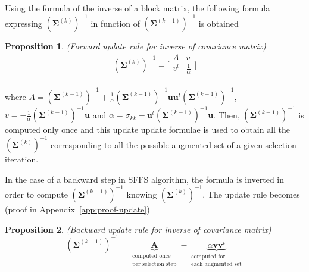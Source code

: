 \documentclass[journal,peerreview,onecolumn]{IEEEtran}
\newtheorem{prop}{Proposition}
\begin{document}
        Using the formula of the inverse of a block matrix, the following formula expressing $(\boldsymbol{\Sigma}^{(k)})^{-1}$ in function of $(\boldsymbol{\Sigma}^{(k-1)})^{-1}$ is obtained
        \begin{prop}
        \label{eq:update-inv}
            (Forward update rule for inverse of covariance matrix)
            \begin{equation*}
                (\boldsymbol{\Sigma}^{(k)})^{-1} =
                \bigg[\begin{array}{cc}
                A & v \\
                v^t  & \frac{1}{\alpha} \\
                \end{array}\bigg]
            \end{equation*}
        \end{prop}
        where $A = (\boldsymbol{\Sigma}^{(k-1)})^{-1} + \frac{1}{\alpha} (\boldsymbol{\Sigma}^{(k-1)})^{-1} \mathbf{u} \mathbf{u}^t (\boldsymbol{\Sigma}^{(k-1)})^{-1}$, $v = - \frac{1}{\alpha} (\boldsymbol{\Sigma}^{(k-1)})^{-1} \mathbf{u}$ and $ \alpha = \sigma_{kk} - \mathbf{u}^t (\boldsymbol{\Sigma}^{(k-1)})^{-1} \mathbf{u}$. Then, $(\boldsymbol{\Sigma}^{(k-1)})^{-1}$ is computed only once and this update update formulae is used to obtain all the $(\boldsymbol{\Sigma}^{(k)})^{-1}$ corresponding to all the possible augmented set of a given selection iteration.

        In the case of a backward step in SFFS algorithm, the formula is inverted in order to compute $(\boldsymbol{\Sigma}^{(k-1)})^{-1}$ knowing $(\boldsymbol{\Sigma}^{(k)})^{-1}$. The update rule becomes (proof in Appendix~\ref{app:proof-update})
        \begin{prop}
        \label{eq:update-inv-back}
            (Backward update rule for inverse of covariance matrix)
            \begin{equation*}
                (\boldsymbol{\Sigma}^{(k-1)})^{-1} = \underbrace{\mathbf{A}}_{\substack{\text{computed once}\\ \text{per selection step}}} - \underbrace{\alpha \mathbf{v} \mathbf{v}^t}_{\substack{\text{computed for} \\ \text{each augmented set}}}
            \end{equation*}
        \end{prop}
\end{document}

